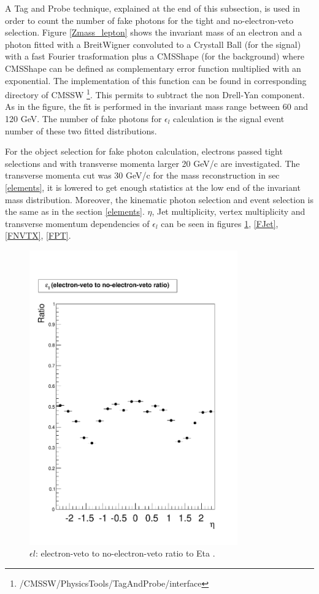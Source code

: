 \documentclass[12pt,oneandhalf,chaparabic,phys,ms,eng]{metu}
\begin{document}
A Tag and Probe technique, explained at the end of this subsection, is used in order to count the number of fake photons for the tight and no-electron-veto selection. Figure \ref{Zmass_lepton} shows the invariant mass of an electron and a photon fitted with a BreitWigner \cite{R35} convoluted to a Crystall Ball \cite{R35} (for the signal) with a fast Fourier trasformation plus a CMSShape (for the background) where CMSShape can be defined as complementary error function multiplied with an exponential. The implementation of this function can be found in corresponding directory of CMSSW \footnote{/CMSSW/PhysicsTools/TagAndProbe/interface}.
This permits to subtract the non Drell-Yan component. As in the figure, the fit is performed in the invariant mass range between 60 and 120 GeV. The number of fake photons for $\epsilon_{l}$ calculation is the signal event number of these two fitted distributions.

For the object selection for fake photon calculation, electrons passed tight selections and with transverse momenta larger 20 GeV/c are investigated. The transverse momenta cut was 30 GeV/c for the mass reconstruction in sec \ref{elements}, it is lowered to get enough statistics at the low end of the invariant mass distribution. Moreover, the kinematic photon selection and event selection is the same as in the section \ref{elements}. $\eta$, Jet multiplicity, vertex multiplicity and transverse momentum dependencies of $\epsilon_{l}$ can be seen in figures \ref{Feta}, \ref{FJet}, \ref{FNVTX}, \ref{FPT}.

\begin{figure}[!hbt]
\centering
    \includegraphics[width=0.8\textwidth]{FakeRateRatio_Eta}
    \caption{\label{Feta} $\epsilon l$: electron-veto to no-electron-veto ratio to Eta .}
\end{figure}
\end{document}
